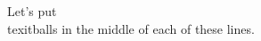 \documentclass[preview]{standalone}
\begin{document}
\begin{center}
Let's put \\texit{balls} in the middle of each of these lines.
\end{center}
\end{document}

